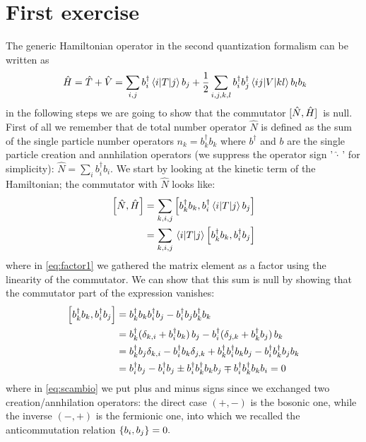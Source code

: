 \documentclass[a4paper]{article}
\begin{document}
\section*{First exercise}
\noindent The generic Hamiltonian operator in the second quantization formalism can be written as 
\[
 \hat{H} = \hat{T} + \hat{V} = \sum_{i,j} b^\dag_i\mel{i}{T}{j}b_j + \frac{1}{2} \sum_{i,j,k,l}b^\dag_ib^\dag_j\mel{ij}{V}{kl}b_l b_k
\]
in the following steps we are going to show that the commutator $\comm*{\hat{N}}{\hat{H}}$ is null.
First of all we remember that de total number operator $\hat{N}$ is defined as the sum of the single particle number operators $n_k = b^\dag_k b_k$ where $b^\dag$ and $b$ are the single particle creation and annhilation operators (we suppress the operator sign '$\,\hat{\cdot}\,$' for simplicity): $\hat{N} = \sum_{i} b^\dag_i b_i.$
We start by looking at the kinetic term of the Hamiltonian; the commutator with $\hat{N}$ looks like:
\begin{align}
	\comm{\hat{N}}{\hat{H}} &=\sum_{k,i,j} \comm{b^\dag_k b_k}{b^\dag_i \mel{i}{T}{j} b_j} \\
					 &=  \sum_{k,i,j}	\mel{i}{T}{j} \comm{b^\dag_k b_k}{b^\dag_i b_j} \label{eq:factor1}
\end{align}
where in \eqref{eq:factor1} we gathered the matrix element as a factor using the linearity of the commutator.
We can show that this sum is null by showing that the commutator part of the expression vanishes:
\begin{align}
\comm{b^\dag_k b_k}{b^\dag_i b_j} &= b^\dag_k b_k b^\dag_i b_j - b^\dag_i b_j b^\dag_k b_k\\
		&= b^\dag_k \pqty*{\delta_{k,i} + b^\dag_i b_k} b_j - b^\dag_i \pqty*{\delta_{j,k} + b^\dag_k b_j} b_k\\
		&= b^\dag_k b_j \delta_{k,i} - b^\dag_i b_k \delta_{j,k} + b^\dag_k b^\dag_i b_k b_j - b^\dag_i b^\dag_k b_j b_k \\
		&= b^\dag_i b_j - b^\dag_i b_j \pm b^\dag_i b^\dag_k b_k b_j \mp b^\dag_i b^\dag_k b_k b_i = 0 \label{eq:scambio}
\end{align}
where in \eqref{eq:scambio} we put plus and minus signs since we exchanged two creation/annhilation operators: the direct case $(+, -)$ is the bosonic one, while the inverse $(-, +)$ is the fermionic one, into which we recalled the anticommutation relation $\acomm{b_i}{b_j} = 0.$
\end{document}
